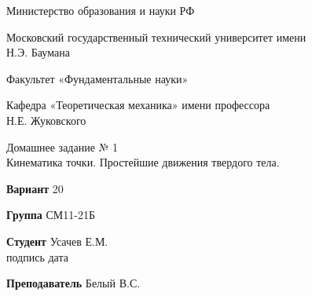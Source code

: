\documentclass{article}
\begin{document}




\thispagestyle{empty}

\begingroup
\setlength{\parindent}{0pt}

\begin{bfseries}

\vspace*{0cm}
Министерство образования и науки РФ

\vspace{2cm}
Московский государственный технический университет имени\\Н.Э. Баумана

\vspace{2cm}
Факультет «Фундаментальные науки»

\vspace{2cm}
Кафедра «Теоретическая механика» имени профессора\\ Н.Е. Жуковского

\vspace{2cm}

Домашнее задание № 1\\
Кинематика точки. Простейшие движения твердого тела.

\end{bfseries}

\vspace{2cm}

\textbf{Вариант} \hspace{0.5cm} 20

\vspace{0.5cm}

\textbf{Группа} \hspace{0.5cm} СМ11-21Б

\vspace{0.5cm}

\textbf{Студент} \hspace{0.5cm} Усачев Е.М. \hspace{1.5cm} \underline{\hspace{3cm}} 
\hspace{1cm}\underline{\hspace{3cm}}\\
\small\hspace*{8.5cm} подпись \hspace{2.7 cm} дата \normalsize

\vspace{0cm}
\textbf{Преподаватель} \hspace{0.5cm} Белый В.С.
\end{document}
